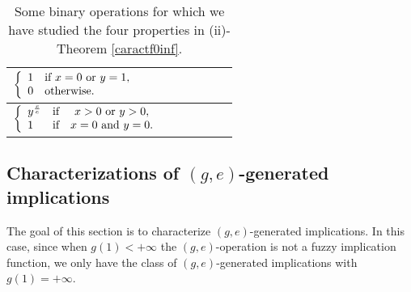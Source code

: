 \begin{table}[t]
\begin{center}
\begin{adjustbox}{max width=\textwidth}
\begin{tabular}{|p{57mm}|M{30mm}|M{30mm}|M{30mm}|c|c|}
				$\left\{\begin{array}{ll} 1& \hbox{if } x=0 \hbox{ or } y=1 ,\\ 0& \hbox{otherwise}.\end{array}\right.$& \cmark &\cmark & \cmark & \cmark & \xmark\\ 
				\hline
				$\left\{ \begin{array}{lcc}
					y^{\frac{x}{e}} &   \hbox{if}  & x >0 \text{ or } y>0,         \\ 1  & \hbox{if}  & x=0 \text{ and } y=0.
				\end{array}
				\right.$ & \cmark &\cmark & \cmark & \cmark & \cmark\\
				\hline
			\end{tabular}
		\end{adjustbox}
	\end{center}
	\caption[Examples that prove that none of the additional properties in the characterization of $(f,e)$-implications with $f(0)=+\infty$ is stronger than any of the others.]{Some binary operations for which we have studied the four properties in (ii)-Theorem \ref{caractf0inf}.}\label{independence}
\end{table}

\subsection{Characterizations of $(g,e)$-generated implications}
The goal of this section is to characterize $(g,e)$-generated implications. In this case, since when $g(1) < +\infty$ the $(g,e)$-operation is not a fuzzy implication function, we only have the class of $(g,e)$-generated implications with $g(1)=+\infty$.

